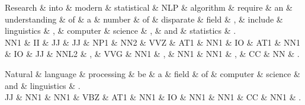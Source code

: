 \documentclass{article}
\begin{document}
\begin{dependency}[theme = simple]
\begin{deptext}[column sep=1em]
Research \& into \& modern \& statistical \& NLP \& algorithm \& require \& an \& understanding \& of \& a \& number \& of \& disparate \& field \& , \& include \& linguistics \& , \& computer \& science \& , \& and \& statistics \& . \\
NN1 \& II \& JJ \& JJ \& NP1 \& NN2 \& VVZ \& AT1 \& NN1 \& IO \& AT1 \& NN1 \& IO \& JJ \& NNL2 \& , \& VVG \& NN1 \& , \& NN1 \& NN1 \& , \& CC \& NN \& . \\
\end{deptext}
\end{dependency}

\begin{dependency}[theme = simple]
\begin{deptext}[column sep=1em]
Natural \& language \& processing \& be \& a \& field \& of \& computer \& science \& and \& linguistics \& . \\
JJ \& NN1 \& NN1 \& VBZ \& AT1 \& NN1 \& IO \& NN1 \& NN1 \& CC \& NN1 \& . \\
\end{deptext}
\end{dependency}
\end{document}
